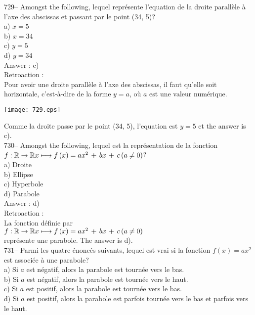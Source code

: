 ﻿\documentclass[letterpaper, 12pt]{article}
\begin{document}
729-- Amongst the following, lequel repr\'esente l'equation de
la droite parall\`ele \`a l'axe des abscissas et passant par le point (34,
5)?\\
a) $x=5$\\
b) $x=34$\\
c) $y=5$\\
d) $y=34$\\

Answer : c)\\

Retroaction : \\
Pour avoir une droite parall\`ele \`a l'axe des abscissas, il faut
qu'elle soit horizontale, c'est-\`a-dire de la forme $y=a$, o\`u $a$
est une valeur num\'erique.   \begin{center}
    \texttt{[image: 729.eps]}
    \end{center}
     Comme la droite passe par le point (34, 5), l'equation est
$y=5$ et the answer is c).\\


730-- Amongst the following, lequel est la repr\'esentation de la
fonction \\
$f :\mathbb{R}\rightarrow\mathbb{R}\\
x\longmapsto f\left( x\right) =ax^{2}\,+\,bx\,+\,c \left( a\neq 0
\right)$?\\
a) Droite\\
b) Ellipse \\
c) Hyperbole\\
d) Parabole \\

Answer : d)\\

Retroaction : \\
La fonction d\'efinie par\\
$f :\mathbb{R}\rightarrow\mathbb{R}\\
x\longmapsto f\left( x\right) =ax^{2}\,+\,bx\,+\,c \left( a\neq 0 \right)$
\\
repr\'esente une parabole.  The answer is d).\\

731-- Parmi les quatre \'enonc\'es suivants, lequel est vrai si la fonction
$f(x)=ax^{2}$ est associ\'ee \`a une parabole?\\
a) Si $a$ est n\'egatif, alors la parabole est tourn\'ee vers le bas.\\
b) Si $a$ est n\'egatif, alors la parabole est tourn\'ee vers le haut.  \\
c) Si $a$ est positif, alors la parabole est tourn\'ee vers le bas.\\
d) Si $a$ est positif, alors la parabole est parfois tourn\'ee vers le bas
et parfois vers le haut.\\
\end{document}
